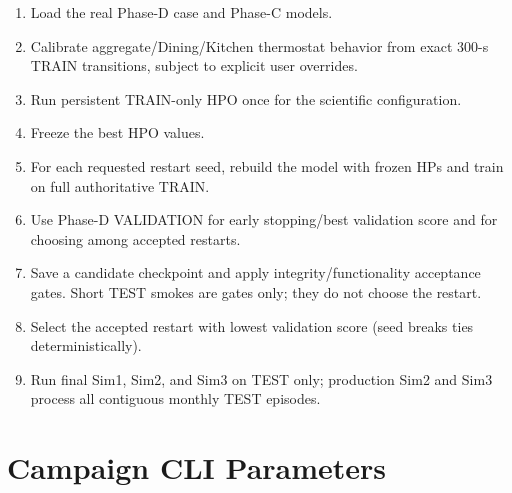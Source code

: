 \documentclass[11pt]{article}
\begin{document}
\begin{enumerate}
  \item Load the real Phase-D case and Phase-C models.
  \item Calibrate aggregate/Dining/Kitchen thermostat behavior from exact 300-s TRAIN transitions, subject to explicit user overrides.
  \item Run persistent TRAIN-only HPO once for the scientific configuration.
  \item Freeze the best HPO values.
  \item For each requested restart seed, rebuild the model with frozen HPs and train on full authoritative TRAIN.
  \item Use Phase-D VALIDATION for early stopping/best validation score and for choosing among accepted restarts.
  \item Save a candidate checkpoint and apply integrity/functionality acceptance gates. Short TEST smokes are gates only; they do not choose the restart.
  \item Select the accepted restart with lowest validation score (seed breaks ties deterministically).
  \item Run final Sim1, Sim2, and Sim3 on TEST only; production Sim2 and Sim3 process all contiguous monthly TEST episodes.
\end{enumerate}

\section{Campaign CLI Parameters}
\end{document}
